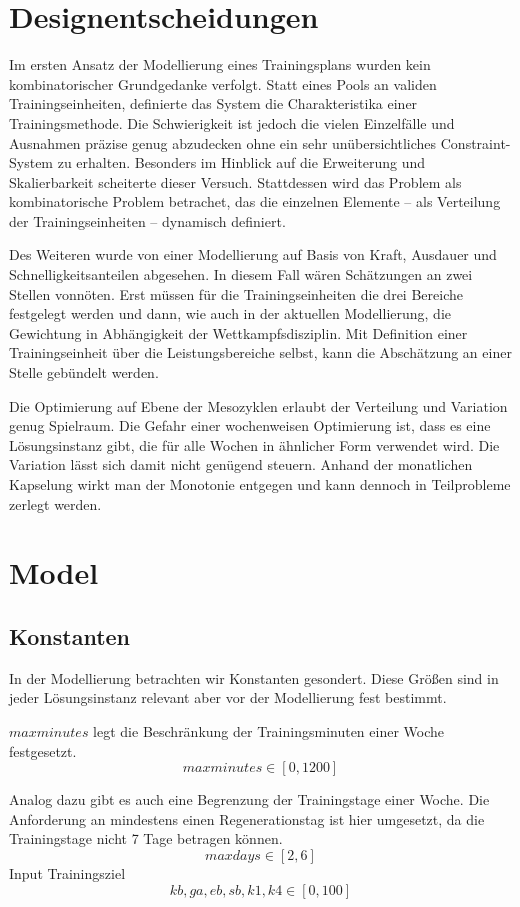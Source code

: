 \section{Designentscheidungen}
Im ersten Ansatz der Modellierung eines Trainingsplans wurden kein kombinatorischer Grundgedanke verfolgt. Statt eines Pools an validen Trainingseinheiten, definierte das System die Charakteristika einer Trainingsmethode. Die Schwierigkeit ist jedoch die vielen Einzelfälle und Ausnahmen präzise genug abzudecken ohne ein sehr unübersichtliches Constraint-System zu erhalten. Besonders im Hinblick auf die Erweiterung und Skalierbarkeit scheiterte dieser Versuch. Stattdessen wird das Problem als kombinatorische Problem betrachet, das die einzelnen Elemente -- als Verteilung der Trainingseinheiten -- dynamisch definiert. \par
Des Weiteren wurde von einer Modellierung auf Basis von Kraft, Ausdauer und Schnelligkeitsanteilen abgesehen. In diesem Fall wären Schätzungen an zwei Stellen vonnöten. Erst müssen für die Trainingseinheiten die drei Bereiche festgelegt werden und dann, wie auch in der aktuellen Modellierung, die Gewichtung in Abhängigkeit der Wettkampfsdisziplin. Mit Definition einer Trainingseinheit über die Leistungsbereiche selbst, kann die Abschätzung an einer Stelle gebündelt werden.\par
Die Optimierung auf Ebene der Mesozyklen erlaubt der Verteilung und Variation genug Spielraum. Die Gefahr einer wochenweisen Optimierung ist, dass es eine Lösungsinstanz gibt, die für alle Wochen in ähnlicher Form verwendet wird. Die Variation lässt sich damit nicht genügend steuern. Anhand der monatlichen Kapselung wirkt man der Monotonie entgegen und kann dennoch in Teilprobleme zerlegt werden.

\section{Model}
\subsection{Konstanten}
In der Modellierung betrachten wir Konstanten gesondert. Diese Größen sind in jeder Lösungsinstanz relevant aber vor der Modellierung fest bestimmt.

$maxminutes$ legt die Beschränkung der Trainingsminuten einer Woche festgesetzt.
\[ maxminutes \in [0, 1200] \]

Analog dazu gibt es auch eine Begrenzung der Trainingstage einer Woche. Die Anforderung an mindestens einen Regenerationstag ist hier umgesetzt, da die Trainingstage nicht 7 Tage betragen können.
\[ maxdays \in [2, 6] \]
Input Trainingsziel
\[ kb, ga, eb, sb, k1, k4 \in [0, 100] \]

